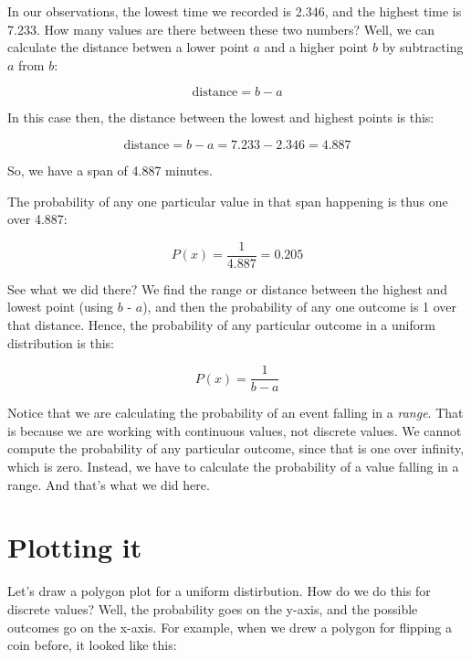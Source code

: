 \documentclass[../../../main.tex]{subfiles}
\begin{document}
In our observations, the lowest time we recorded is 2.346, and the highest time is 7.233. How many values are there between these two numbers? Well, we can calculate the distance betwen a lower point $a$ and a higher point $b$ by subtracting $a$ from $b$:

\begin{equation*}
  \text{distance} = b - a
\end{equation*}

In this case then, the distance between the lowest and highest points is this:

\begin{equation*}
  \text{distance} = b - a = 7.233 - 2.346 = 4.887
\end{equation*}

So, we have a span of 4.887 minutes.

The probability of any one particular value in that span happening is thus one over 4.887:

\begin{equation*}
  P(x) = \frac{1}{4.887} = 0.205
\end{equation*} 

See what we did there? We find the range or distance between the highest and lowest point (using $b$ - $a$), and then the probability of any one outcome is 1 over that distance. Hence, the probability of any particular outcome in a uniform distribution is this:

\begin{equation*}
  P(x) = \frac{1}{b - a}
\end{equation*} 

Notice that we are calculating the probability of an event falling in a \emph{range}. That is because we are working with continuous values, not discrete values. We cannot compute the probability of any particular outcome, since that is one over infinity, which is zero. Instead, we have to calculate the probability of a value falling in a range. And that's what we did here.


\section{Plotting it}

Let's draw a polygon plot for a uniform distirbution. How do we do this for discrete values? Well, the probability goes on the y-axis, and the possible outcomes go on the x-axis. For example, when we drew a polygon for flipping a coin before, it looked like this:
\end{document}
